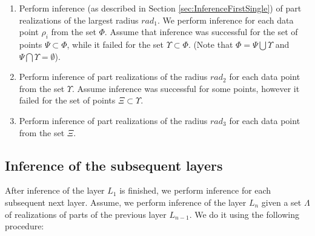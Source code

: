 \documentclass[runningheads]{llncs}
\begin{document}
\begin{enumerate}

\item Perform inference (as described in Section
\ref{sec:InferenceFirstSingle}) of part realizations of the largest
radius $rad_1$. We perform inference for each data point $\rho_i$
from the set $\Phi$. Assume that inference was successful for the
set of points $\Psi \subset \Phi$, while it failed for the set
$\Upsilon \subset \Phi$. (Note that $\Phi = \Psi \bigcup \Upsilon$
and $\Psi \bigcap \Upsilon = \emptyset$).

\item Perform inference of part realizations of the
radius $rad_2$ for each data point from the set $\Upsilon$. Assume
inference was successful for some points, however it failed for the
set of points $\Xi \subset \Upsilon$.

\item Perform inference of part realizations of the
radius $rad_3$ for each data point from the set $\Xi$.

\end{enumerate}


\subsection{Inference of the subsequent layers\label{sec:InferenceNext}}

After inference of the layer $L_1$ is finished, we perform inference
for each subsequent next layer. Assume, we perform inference of the
layer $L_n$ given a set $\Lambda$ of realizations of parts of the
previous layer $L_{n-1}$. We do it using the following procedure:
\end{document}
